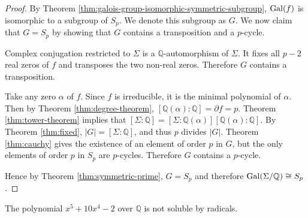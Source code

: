 \begin{proof}
	By Theorem \ref{thm:galois-group-isomorphic-symmetric-subgroup}, $\operatorname{Gal}(f)$ is isomorphic to a subgroup of $S_p$. We denote this subgroup as $G$. We now claim that $G = S_p$ by showing that $G$ contains a transposition and a $p$-cycle.

    Complex conjugation restricted to $\Sigma$ is a $\mathbb Q$-automorphism of $\Sigma$. It fixes all $p - 2$ real zeros of $f$ and transposes the two non-real zeros. Therefore $G$ contains a transposition. 

    Take any zero $\alpha$ of $f$. Since $f$ is irreducible, it is the minimal polynomial of $\alpha$. Then by Theorem \ref{thm:degree-theorem}, $[\mathbb Q(\alpha) : \mathbb Q] = \partial f = p. $ Theorem \ref{thm:tower-theorem} implies that $[\Sigma : \mathbb Q] = [\Sigma : \mathbb Q(\alpha)] [ \mathbb Q(\alpha) : \mathbb Q]. $ By Theorem \ref{thm:fixed}, $|G| = [\Sigma : \mathbb Q]$, and thus $p$ divides $|G|$. Theorem \ref{thm:cauchy} gives the existence of an element of order $p$ in $G$, but the only elements of order $p$ in $S_p$ are $p$-cycles. Therefore $G$ contains a $p$-cycle.

    Hence by Theorem \ref{thm:symmetric-prime}, $ G = S_p$ and therefore $\operatorname{Gal}(\Sigma / \mathbb Q) \cong S_p$.
\end{proof}

\begin{example}
    The polynomial $x^5 + 10 x^4 - 2$ over $\mathbb Q$ is not soluble by radicals.
\end{example}

